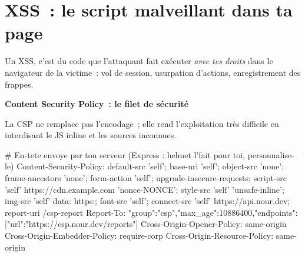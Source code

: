 \documentclass[12pt,a4paper,twoside,openright]{book}
\newcommand{\etape}[1]{\par\medskip\noindent\textbf{\large #1}\par\smallskip}
\begin{document}
\section{XSS~: le script malveillant dans ta page}

Un XSS, c'est du code que l'attaquant fait ex\'ecuter \emph{avec tes droits} dans le navigateur de
la victime~: vol de session, usurpation d'actions, enregistrement des frappes.


\etape{Content Security Policy~: le filet de s\'ecurit\'e}
La CSP ne remplace pas l'encodage~; elle rend l'exploitation tr\`es difficile en interdisant
le JS inline et les sources inconnues.

\begin{codeconf}
# En-tete envoye par ton serveur (Express : helmet l'fait pour toi, personnalise-le)
Content-Security-Policy: default-src 'self'; base-uri 'self'; object-src 'none';
  frame-ancestors 'none'; form-action 'self'; upgrade-insecure-requests;
  script-src 'self' https://cdn.example.com 'nonce-{NONCE}';
  style-src 'self' 'unsafe-inline'; img-src 'self' data: https:; font-src 'self';
  connect-src 'self' https://api.nour.dev; report-uri /csp-report
Report-To: {"group":"csp","max_age":10886400,"endpoints":[{"url":"https://csp.nour.dev/reports"}]}
Cross-Origin-Opener-Policy: same-origin
Cross-Origin-Embedder-Policy: require-corp
Cross-Origin-Resource-Policy: same-origin
\end{codeconf}
\end{document}
